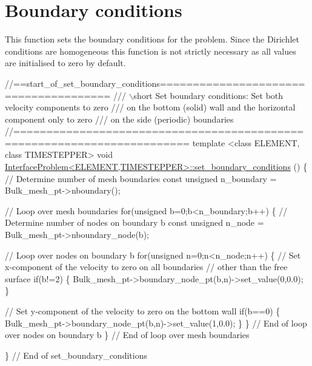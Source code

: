  

\hypertarget{index_set_boundary_conditions}{}\section{Boundary conditions}\label{index_set_boundary_conditions}
This function sets the boundary conditions for the problem. Since the Dirichlet conditions are homogeneous this function is not strictly necessary as all values are initialised to zero by default.


\begin{DoxyCodeInclude}
\textcolor{comment}{//==start\_of\_set\_boundary\_conditions======================================}
\textcolor{comment}{/// \(\backslash\)short Set boundary conditions: Set both velocity components to zero}
\textcolor{comment}{}\textcolor{comment}{/// on the bottom (solid) wall and the horizontal component only to zero}
\textcolor{comment}{}\textcolor{comment}{/// on the side (periodic) boundaries}
\textcolor{comment}{}\textcolor{comment}{//========================================================================}
\textcolor{keyword}{template} <\textcolor{keyword}{class} ELEMENT, \textcolor{keyword}{class} TIMESTEPPER>
\textcolor{keywordtype}{void} \hyperlink{classInterfaceProblem_a844445832ad7a32aa9f5d03ffdb40ebb}{InterfaceProblem<ELEMENT,TIMESTEPPER>::set\_boundary\_conditions}
      ()
\{
 \textcolor{comment}{// Determine number of mesh boundaries}
 \textcolor{keyword}{const} \textcolor{keywordtype}{unsigned} n\_boundary = Bulk\_mesh\_pt->nboundary();
 
 \textcolor{comment}{// Loop over mesh boundaries}
 \textcolor{keywordflow}{for}(\textcolor{keywordtype}{unsigned} b=0;b<n\_boundary;b++)
  \{
   \textcolor{comment}{// Determine number of nodes on boundary b}
   \textcolor{keyword}{const} \textcolor{keywordtype}{unsigned} n\_node = Bulk\_mesh\_pt->nboundary\_node(b);
   
   \textcolor{comment}{// Loop over nodes on boundary b}
   \textcolor{keywordflow}{for}(\textcolor{keywordtype}{unsigned} n=0;n<n\_node;n++)
    \{
     \textcolor{comment}{// Set x-component of the velocity to zero on all boundaries}
     \textcolor{comment}{// other than the free surface}
     \textcolor{keywordflow}{if}(b!=2)
      \{
       Bulk\_mesh\_pt->boundary\_node\_pt(b,n)->set\_value(0,0.0);
      \}
     
     \textcolor{comment}{// Set y-component of the velocity to zero on the bottom wall}
     \textcolor{keywordflow}{if}(b==0)
      \{
       Bulk\_mesh\_pt->boundary\_node\_pt(b,n)->set\_value(1,0.0);
      \}
    \} \textcolor{comment}{// End of loop over nodes on boundary b}
  \} \textcolor{comment}{// End of loop over mesh boundaries}
 
\} \textcolor{comment}{// End of set\_boundary\_conditions}

\end{DoxyCodeInclude}




